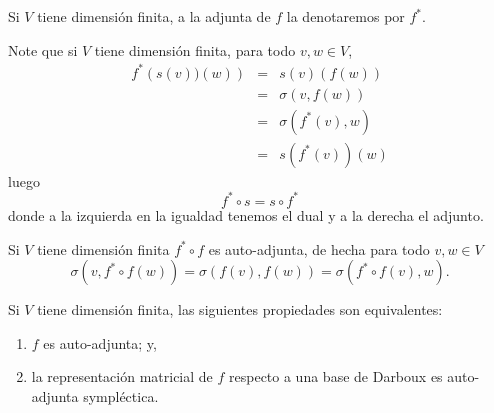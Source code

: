 \begin{nota}
Si $V$ tiene dimensi\'on finita, a la adjunta de $f$ la denotaremos por $f^*$.
\end{nota}

\begin{obs}
Note que si $V$ tiene dimensi\'on finita, para todo $v,w\in V$,
\begin{eqnarray*}
f^*\left(s(v))(w)\right) & = & s(v)\left(f(w)\right)\\
 & = & \sigma(v,f(w))\\
 & = & \sigma(f^*(v),w)\\
 & = & s\left(f^*(v)\right)(w)
\end{eqnarray*}
luego
\[
f^*\circ s=s\circ f^*
\]
donde a la izquierda en la igualdad tenemos el dual y a la derecha el adjunto.
\end{obs}

\begin{obs}
Si $V$ tiene dimensi\'on finita $f^*\circ f$ es auto-adjunta, de hecha para todo $v,w\in V$
\[
\sigma(v,f^*\circ f(w))=\sigma(f(v),f(w))=\sigma(f^*\circ f(v),w).
\]
\end{obs}

\begin{prop}
Si $V$ tiene dimensi\'on finita, las siguientes propiedades son equivalentes:
\begin{enumerate}
\item $f$ es auto-adjunta; y,
\item la representaci\'on matricial de $f$ respecto a una base de Darboux es auto-adjunta sympl\'ectica.
\end{enumerate}
\end{prop}

